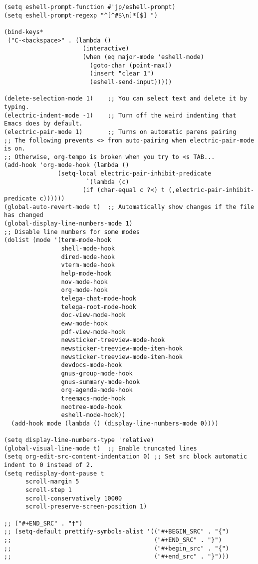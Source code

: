 \documentclass[11pt]{article}
\begin{document}
\begin{verbatim}
(setq eshell-prompt-function #'jp/eshell-prompt)
(setq eshell-prompt-regexp "^[^#$\n]*[$] ")

(bind-keys*
 ("C-<backspace>" . (lambda ()
                      (interactive)
                      (when (eq major-mode 'eshell-mode)
                        (goto-char (point-max))
                        (insert "clear 1")
                        (eshell-send-input)))))

(delete-selection-mode 1)    ;; You can select text and delete it by typing.
(electric-indent-mode -1)    ;; Turn off the weird indenting that Emacs does by default.
(electric-pair-mode 1)       ;; Turns on automatic parens pairing
;; The following prevents <> from auto-pairing when electric-pair-mode is on.
;; Otherwise, org-tempo is broken when you try to <s TAB...
(add-hook 'org-mode-hook (lambda ()
               (setq-local electric-pair-inhibit-predicate
                       `(lambda (c)
                      (if (char-equal c ?<) t (,electric-pair-inhibit-predicate c))))))
(global-auto-revert-mode t)  ;; Automatically show changes if the file has changed
(global-display-line-numbers-mode 1)
;; Disable line numbers for some modes
(dolist (mode '(term-mode-hook
                shell-mode-hook
                dired-mode-hook
                vterm-mode-hook
                help-mode-hook
                nov-mode-hook
                org-mode-hook
                telega-chat-mode-hook
                telega-root-mode-hook
                doc-view-mode-hook
                eww-mode-hook
                pdf-view-mode-hook
                newsticker-treeview-mode-hook
                newsticker-treeview-mode-item-hook
                newsticker-treeview-mode-item-hook
                devdocs-mode-hook
                gnus-group-mode-hook
                gnus-summary-mode-hook
                org-agenda-mode-hook
                treemacs-mode-hook
                neotree-mode-hook
                eshell-mode-hook))
  (add-hook mode (lambda () (display-line-numbers-mode 0))))

(setq display-line-numbers-type 'relative)
(global-visual-line-mode t)  ;; Enable truncated lines
(setq org-edit-src-content-indentation 0) ;; Set src block automatic indent to 0 instead of 2.
(setq redisplay-dont-pause t
      scroll-margin 5
      scroll-step 1
      scroll-conservatively 10000
      scroll-preserve-screen-position 1)

;; ("#+END_SRC" . "†")
;; (setq-default prettify-symbols-alist '(("#+BEGIN_SRC" . "{")
;;                                        ("#+END_SRC" . "}")
;;                                        ("#+begin_src" . "{")
;;                                        ("#+end_src" . "}")))


\end{verbatim}
\end{document}
